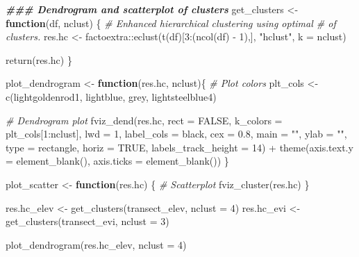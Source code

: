 \documentclass[
]{article}
\newenvironment{Shaded}{\begin{snugshade}}{\end{snugshade}}
\newcommand{\AttributeTok}[1]{\textcolor[rgb]{0.77,0.63,0.00}{#1}}
\newcommand{\CommentTok}[1]{\textcolor[rgb]{0.56,0.35,0.01}{\textit{#1}}}
\newcommand{\ConstantTok}[1]{\textcolor[rgb]{0.00,0.00,0.00}{#1}}
\newcommand{\ControlFlowTok}[1]{\textcolor[rgb]{0.13,0.29,0.53}{\textbf{#1}}}
\newcommand{\DecValTok}[1]{\textcolor[rgb]{0.00,0.00,0.81}{#1}}
\newcommand{\DocumentationTok}[1]{\textcolor[rgb]{0.56,0.35,0.01}{\textbf{\textit{#1}}}}
\newcommand{\FloatTok}[1]{\textcolor[rgb]{0.00,0.00,0.81}{#1}}
\newcommand{\FunctionTok}[1]{\textcolor[rgb]{0.00,0.00,0.00}{#1}}
\newcommand{\NormalTok}[1]{#1}
\newcommand{\OtherTok}[1]{\textcolor[rgb]{0.56,0.35,0.01}{#1}}
\newcommand{\SpecialCharTok}[1]{\textcolor[rgb]{0.00,0.00,0.00}{#1}}
\newcommand{\StringTok}[1]{\textcolor[rgb]{0.31,0.60,0.02}{#1}}
\begin{document}
\begin{Shaded}
\begin{Highlighting}[]

\DocumentationTok{\#\#\# Dendrogram and scatterplot of clusters}
\NormalTok{get\_clusters }\OtherTok{\textless{}{-}} \ControlFlowTok{function}\NormalTok{(df, nclust) \{}
  \CommentTok{\# Enhanced hierarchical clustering using optimal \# of clusters.}
\NormalTok{  res.hc }\OtherTok{\textless{}{-}}\NormalTok{ factoextra}\SpecialCharTok{::}\FunctionTok{eclust}\NormalTok{(}\FunctionTok{t}\NormalTok{(df)[}\DecValTok{3}\SpecialCharTok{:}\NormalTok{(}\FunctionTok{ncol}\NormalTok{(df) }\SpecialCharTok{{-}} \DecValTok{1}\NormalTok{),], }
                                 \StringTok{"hclust"}\NormalTok{, }\AttributeTok{k =}\NormalTok{ nclust)}
  
  \FunctionTok{return}\NormalTok{(res.hc)}
\NormalTok{\}}

\NormalTok{plot\_dendrogram }\OtherTok{\textless{}{-}} \ControlFlowTok{function}\NormalTok{(res.hc, nclust)\{}
  \CommentTok{\# Plot colors}
\NormalTok{  plt\_cols }\OtherTok{\textless{}{-}} \FunctionTok{c}\NormalTok{(}\StringTok{\textquotesingle{}lightgoldenrod1\textquotesingle{}}\NormalTok{, }\StringTok{\textquotesingle{}lightblue\textquotesingle{}}\NormalTok{, }\StringTok{\textquotesingle{}grey\textquotesingle{}}\NormalTok{, }\StringTok{\textquotesingle{}lightsteelblue4\textquotesingle{}}\NormalTok{)}
  
  \CommentTok{\# Dendrogram plot}
  \FunctionTok{fviz\_dend}\NormalTok{(res.hc, }\AttributeTok{rect =} \ConstantTok{FALSE}\NormalTok{, }\AttributeTok{k\_colors =}\NormalTok{ plt\_cols[}\DecValTok{1}\SpecialCharTok{:}\NormalTok{nclust], }
            \AttributeTok{lwd =} \DecValTok{1}\NormalTok{, }\AttributeTok{label\_cols =} \StringTok{\textquotesingle{}black\textquotesingle{}}\NormalTok{, }\AttributeTok{cex =} \FloatTok{0.8}\NormalTok{, }\AttributeTok{main =} \StringTok{""}\NormalTok{, }\AttributeTok{ylab =} \StringTok{""}\NormalTok{, }
            \AttributeTok{type =} \StringTok{\textquotesingle{}rectangle\textquotesingle{}}\NormalTok{, }\AttributeTok{horiz =} \ConstantTok{TRUE}\NormalTok{, }\AttributeTok{labels\_track\_height =} \DecValTok{14}\NormalTok{) }\SpecialCharTok{+} 
    \FunctionTok{theme}\NormalTok{(}\AttributeTok{axis.text.y =} \FunctionTok{element\_blank}\NormalTok{(), }\AttributeTok{axis.ticks =} \FunctionTok{element\_blank}\NormalTok{())}
\NormalTok{\}}

\NormalTok{plot\_scatter }\OtherTok{\textless{}{-}} \ControlFlowTok{function}\NormalTok{(res.hc) \{}
  \CommentTok{\# Scatterplot}
  \FunctionTok{fviz\_cluster}\NormalTok{(res.hc)}
\NormalTok{\}}

\NormalTok{res.hc\_elev }\OtherTok{\textless{}{-}} \FunctionTok{get\_clusters}\NormalTok{(transect\_elev, }\AttributeTok{nclust =} \DecValTok{4}\NormalTok{)}
\NormalTok{res.hc\_evi }\OtherTok{\textless{}{-}} \FunctionTok{get\_clusters}\NormalTok{(transect\_evi, }\AttributeTok{nclust =} \DecValTok{3}\NormalTok{)}

\FunctionTok{plot\_dendrogram}\NormalTok{(res.hc\_elev, }\AttributeTok{nclust =} \DecValTok{4}\NormalTok{)}
\end{Highlighting}
\end{Shaded}
\end{document}
